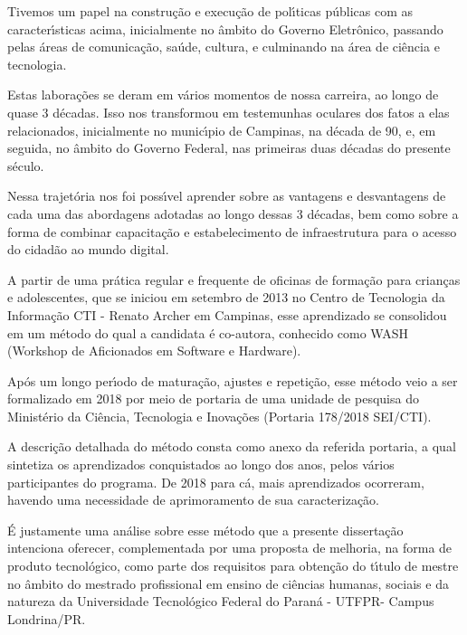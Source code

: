 \documentclass[
12pt,		%
openright,	%
twoside,  %
a4paper,			%
chapter=TITLE,		%
english,			%
french,				%
spanish,			%
brazil				%
]{USPSC-classe/USPSC}
\begin{document}
Tivemos um papel na constru\c{c}\~ao e execu\c{c}\~ao de pol\'{\i}ticas p\'ublicas com as caracter\'{\i}sticas acima, inicialmente no \^ambito do Governo Eletr\^onico, passando pelas \'areas de comunica\c{c}\~ao, sa\'ude, cultura, e culminando na \'area de ci\^encia e tecnologia.




Estas labora\c{c}\~oes  se deram em v\'arios momentos de nossa carreira, ao longo de quase 3 d\'ecadas. Isso nos transformou em testemunhas oculares dos fatos a elas relacionados, inicialmente no  munic\'{\i}pio de Campinas, na d\'ecada de 90, e, em seguida, no \^ambito do Governo Federal, nas primeiras duas d\'ecadas do presente s\'eculo.




Nessa trajet\'oria nos foi poss\'{\i}vel aprender sobre as vantagens e desvantagens de cada uma das abordagens adotadas ao longo dessas 3 d\'ecadas, bem como sobre a forma de combinar capacita\c{c}\~ao e estabelecimento de infraestrutura para o acesso do cidad\~ao ao mundo digital.




A partir de uma pr\'atica regular e frequente de oficinas de forma\c{c}\~ao para  crian\c{c}as e adolescentes, que se iniciou em setembro de 2013 no Centro de Tecnologia da Informa\c{c}\~ao CTI - Renato Archer em Campinas, esse aprendizado se consolidou em um m\'etodo do qual a candidata \'e co-autora, conhecido como WASH (Workshop de Aficionados em Software e Hardware).




Ap\'os um longo per\'{\i}odo de matura\c{c}\~ao, ajustes e repeti\c{c}\~ao, esse m\'etodo veio a ser formalizado em 2018 por meio de portaria de uma unidade de pesquisa do Minist\'erio da Ci\^encia, Tecnologia e Inova\c{c}\~oes (Portaria 178/2018 SEI/CTI).




A descri\c{c}\~ao detalhada do m\'etodo consta como anexo da referida portaria, a qual sintetiza os aprendizados conquistados ao longo dos anos, pelos v\'arios participantes do programa. De 2018 para c\'a, mais aprendizados ocorreram, havendo uma necessidade de aprimoramento de sua caracteriza\c{c}\~ao.




\'E justamente uma an\'alise sobre esse m\'etodo que a presente disserta\c{c}\~ao intenciona oferecer, complementada por uma proposta de melhoria, na forma de produto tecnol\'ogico, como parte dos requisitos para obten\c{c}\~ao do t\'{\i}tulo de mestre no \^ambito do mestrado profissional em ensino de ci\^encias humanas, sociais e da natureza da Universidade  Tecnol\'ogico  Federal do Paran\'a - UTFPR- Campus Londrina/PR.
\end{document}
